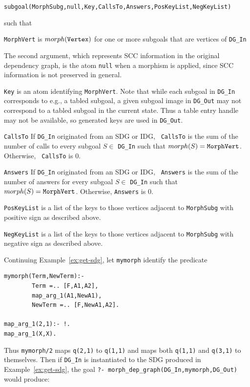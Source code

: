 \begin{description}
{\tt subgoal(MorphSubg,null,Key,CallsTo,Answers,PosKeyList,NegKeyList)} 

such that 

\bi
\item {\tt MorphVert} is $morph({\tt Vertex})$ for one or more
  subgoals that are vertices of {\tt DG\_In}
\item The second argument, which represents SCC information in the
  original dependency graph, is the atom {\tt null} when a morphism is
  applied, since SCC information is not preserved in general.
\item {\tt Key} is an atom identifying {\tt MorphVert}.  Note that
  while each subgoal in {\tt DG\_In} corresponds to e.g., a tabled
  subgoal, a given subgoal image in {\tt DG\_Out} may not correspond to
  a tabled subgoal in the current state.  Thus a table entry handle
  may not be available, so generated keys are used in {\tt DG\_Out}.
\item {\tt CallsTo} If {\tt DG\_In} originated from an SDG or IDG, {\tt
  CallsTo} is the sum of the number of calls to every subgoal $S \in$
  {\tt DG\_In} such that $morph(S) = {\tt MorphVert}$.  Otherwise, {\tt
    CallsTo} is 0.
\item {\tt Answers} If {\tt DG\_In} originated from an SDG or IDG, {\tt
  Answers} is the sum of the number of answers for every subgoal $S
  \in$ {\tt DG\_In} such that $morph(S) = {\tt MorphVert}$.  Otherwise,
     {\tt Answers} is 0.
\item {\tt PosKeyList} is a list of the keys to those vertices adjacent
  to {\tt MorphSubg} with positive sign as described above.
\item {\tt NegKeyList} is a list of the keys to those vertices adjacent
  to {\tt MorphSubg} with negative sign as described above.
\ei

\begin{example} \rm \label{ex:morph-sdg}
Continuing Example~\ref{ex:get-sdg}, let {\tt mymorph} identify the
predicate

\begin{verbatim}
mymorph(Term,NewTerm):-
        Term =.. [F,A1,A2],
        map_arg_1(A1,NewA1),
        NewTerm =.. [F,NewA1,A2].

map_arg_1(2,1):- !.
map_arg_1(X,X).
\end{verbatim}
Thus {\tt mymorph/2} maps {\tt q(2,1)} to {\tt q(1,1)} and maps
both {\tt q(1,1)} and {\tt q(3,1)} to themselves.  Then if {\tt DG\_In}
is instantiated to the SDG produced in Example~\ref{ex:get-sdg}, the
goal {\tt ?- morph\_dep\_graph(DG\_In,mymorph,DG\_Out)} would produce:


\end{example}
\end{description}
